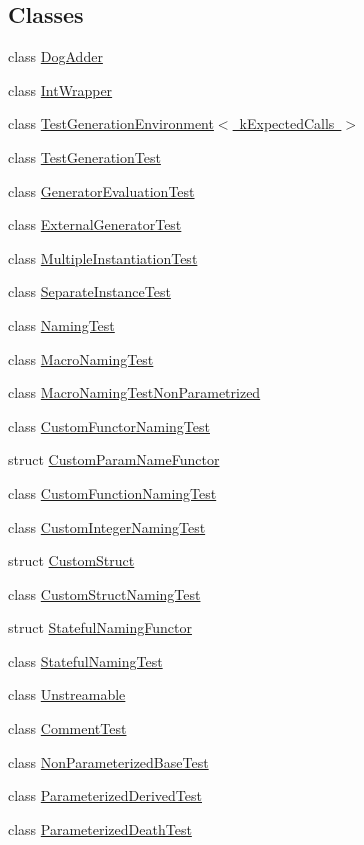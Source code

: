 \subsection*{Classes}
\begin{DoxyCompactItemize}
\item 
class \mbox{\hyperlink{classDogAdder}{Dog\+Adder}}
\item 
class \mbox{\hyperlink{classIntWrapper}{Int\+Wrapper}}
\item 
class \mbox{\hyperlink{classTestGenerationEnvironment}{Test\+Generation\+Environment$<$ k\+Expected\+Calls $>$}}
\item 
class \mbox{\hyperlink{classTestGenerationTest}{Test\+Generation\+Test}}
\item 
class \mbox{\hyperlink{classGeneratorEvaluationTest}{Generator\+Evaluation\+Test}}
\item 
class \mbox{\hyperlink{classExternalGeneratorTest}{External\+Generator\+Test}}
\item 
class \mbox{\hyperlink{classMultipleInstantiationTest}{Multiple\+Instantiation\+Test}}
\item 
class \mbox{\hyperlink{classSeparateInstanceTest}{Separate\+Instance\+Test}}
\item 
class \mbox{\hyperlink{classNamingTest}{Naming\+Test}}
\item 
class \mbox{\hyperlink{classMacroNamingTest}{Macro\+Naming\+Test}}
\item 
class \mbox{\hyperlink{classMacroNamingTestNonParametrized}{Macro\+Naming\+Test\+Non\+Parametrized}}
\item 
class \mbox{\hyperlink{classCustomFunctorNamingTest}{Custom\+Functor\+Naming\+Test}}
\item 
struct \mbox{\hyperlink{structCustomParamNameFunctor}{Custom\+Param\+Name\+Functor}}
\item 
class \mbox{\hyperlink{classCustomFunctionNamingTest}{Custom\+Function\+Naming\+Test}}
\item 
class \mbox{\hyperlink{classCustomIntegerNamingTest}{Custom\+Integer\+Naming\+Test}}
\item 
struct \mbox{\hyperlink{structCustomStruct}{Custom\+Struct}}
\item 
class \mbox{\hyperlink{classCustomStructNamingTest}{Custom\+Struct\+Naming\+Test}}
\item 
struct \mbox{\hyperlink{structStatefulNamingFunctor}{Stateful\+Naming\+Functor}}
\item 
class \mbox{\hyperlink{classStatefulNamingTest}{Stateful\+Naming\+Test}}
\item 
class \mbox{\hyperlink{classUnstreamable}{Unstreamable}}
\item 
class \mbox{\hyperlink{classCommentTest}{Comment\+Test}}
\item 
class \mbox{\hyperlink{classNonParameterizedBaseTest}{Non\+Parameterized\+Base\+Test}}
\item 
class \mbox{\hyperlink{classParameterizedDerivedTest}{Parameterized\+Derived\+Test}}
\item 
class \mbox{\hyperlink{classParameterizedDeathTest}{Parameterized\+Death\+Test}}
\end{DoxyCompactItemize}
